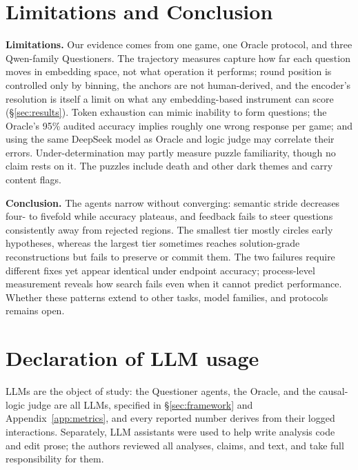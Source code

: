 \documentclass{article}
\begin{document}
\section{Limitations and Conclusion}

\textbf{Limitations.}
Our evidence comes from one game, one Oracle protocol, and three Qwen-family
Questioners. The trajectory measures capture how far each question moves in
embedding space, not what operation it performs; round position is
controlled only by binning, the anchors are not human-derived, and the
encoder's resolution is itself a limit on what any embedding-based instrument
can score (\S\ref{sec:results}). Token
exhaustion can mimic inability to form questions; the Oracle's 95\%
audited accuracy implies roughly one wrong response per game; and using the
same DeepSeek model as Oracle and logic judge may correlate their errors.
Under-determination may partly measure puzzle familiarity, though no claim
rests on it. The puzzles include death and other dark themes and
carry content flags.

\textbf{Conclusion.}
The agents narrow without converging:
semantic stride decreases four- to fivefold while accuracy plateaus, and
feedback fails to steer questions consistently away from rejected regions.
The smallest tier mostly circles early hypotheses, whereas the largest tier
sometimes reaches solution-grade reconstructions but fails to preserve or
commit them. The two failures require different fixes yet appear
identical under endpoint accuracy; process-level measurement reveals how
search fails even when it cannot predict performance. Whether these patterns extend to other tasks, model families, and protocols
remains open.

\section*{Declaration of LLM usage}
LLMs are the object of study: the Questioner agents, the Oracle, and the
causal-logic judge are all LLMs, specified in \S\ref{sec:framework} and
Appendix~\ref{app:metrics}, and every reported number derives from their
logged interactions. Separately, LLM assistants were used to help write
analysis code and edit prose; the authors reviewed all analyses, claims, and
text, and take full responsibility for them.
\end{document}
